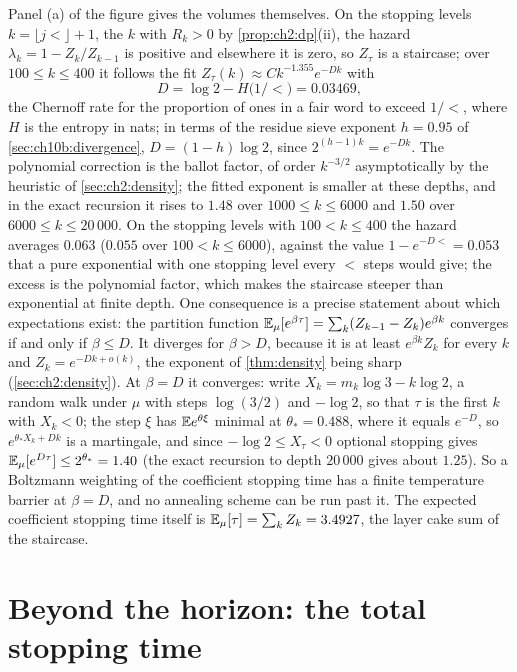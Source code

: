 Panel (a) of the figure gives the volumes themselves. On the stopping levels
$k=\lfloor j\lt\rfloor+1$, the $k$ with $R_k>0$ by \cref{prop:ch2:dp}(ii), the hazard $\lambda_k=1-Z_k/Z_{k-1}$ is positive
and elsewhere it is zero, so $Z_\tau$ is a staircase; over $100\le k\le400$ it
follows the fit $Z_\tau(k)\approx Ck^{-1.355}e^{-Dk}$ with
\[
  D=\log2-H\bigl(1/\lt\bigr)=0.03469,
\]
the Chernoff rate for the proportion of ones in a fair word to exceed
$1/\lt$, where $H$ is the entropy in nats; in terms of the residue sieve exponent
$h=0.95$ of \cref{sec:ch10b:divergence}, $D=(1-h)\log2$, since $2^{(h-1)k}=e^{-Dk}$.
The polynomial correction is the ballot factor, of order $k^{-3/2}$ asymptotically by the heuristic of \cref{sec:ch2:density}; the fitted exponent is smaller at these depths, and in the exact recursion it rises to $1.48$ over $1000\le k\le6000$ and $1.50$ over $6000\le k\le20\,000$.
On the stopping levels with $100<k\le400$ the hazard averages $0.063$ ($0.055$ over $100<k\le6000$), against the value $1-e^{-D\lt}=0.053$
that a pure exponential with one stopping level every $\lt$ steps would give; the excess
is the polynomial factor, which makes the staircase steeper than exponential
at finite depth. One consequence is a
precise statement about which expectations exist: the partition function
$\mathbb{E}_\mu[e^{\beta\tau}]=\sum_k(Z_{k-1}-Z_k)e^{\beta k}$ converges if and only if
$\beta\le D$.
It diverges for $\beta>D$, because it is at least $e^{\beta k}Z_k$ for every $k$ and $Z_k=e^{-Dk+o(k)}$, the exponent of \cref{thm:density} being sharp (\cref{sec:ch2:density}).
At $\beta=D$ it converges: write $X_k=m_k\log3-k\log2$, a random walk under $\mu$ with steps $\log(3/2)$ and $-\log2$, so that $\tau$ is the first $k$ with $X_k<0$; the step $\xi$ has $\mathbb{E} e^{\theta\xi}$ minimal at $\theta_*=0.488$, where it equals $e^{-D}$, so $e^{\theta_*X_k+Dk}$ is a martingale, and since $-\log2\le X_\tau<0$ optional stopping gives $\mathbb{E}_\mu[e^{D\tau}]\le2^{\theta_*}=1.40$ (the exact recursion to depth $20\,000$ gives about $1.25$).
So a Boltzmann weighting of the coefficient stopping time has a finite
temperature barrier at $\beta=D$, and no annealing scheme can be run past it.
The expected coefficient stopping time itself is $\mathbb{E}_\mu[\tau]=\sum_kZ_k=3.4927$, the
layer cake sum of the staircase.

\section{Beyond the horizon: the total stopping time}

